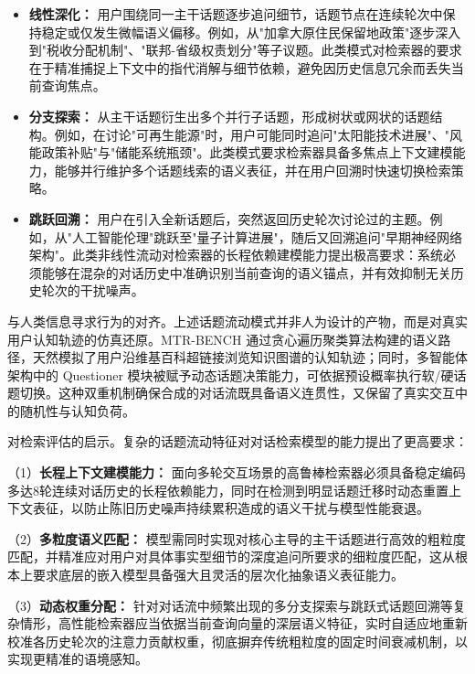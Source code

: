\begin{itemize}
    \item \textbf{线性深化：} 用户围绕同一主干话题逐步追问细节，话题节点在连续轮次中保持稳定或仅发生微幅语义偏移。例如，从"加拿大原住民保留地政策"逐步深入到"税收分配机制"、"联邦-省级权责划分"等子议题。此类模式对检索器的要求在于精准捕捉上下文中的指代消解与细节依赖，避免因历史信息冗余而丢失当前查询焦点。
    
    \item \textbf{分支探索：} 从主干话题衍生出多个并行子话题，形成树状或网状的话题结构。例如，在讨论"可再生能源"时，用户可能同时追问"太阳能技术进展"、"风能政策补贴"与"储能系统瓶颈"。此类模式要求检索器具备多焦点上下文建模能力，能够并行维护多个话题线索的语义表征，并在用户回溯时快速切换检索策略。
    
    \item \textbf{跳跃回溯：} 用户在引入全新话题后，突然返回历史轮次讨论过的主题。例如，从"人工智能伦理"跳跃至"量子计算进展"，随后又回溯追问"早期神经网络架构"。此类非线性流动对检索器的长程依赖建模能力提出极高要求：系统必须能够在混杂的对话历史中准确识别当前查询的语义锚点，并有效抑制无关历史轮次的干扰噪声。
\end{itemize}

与人类信息寻求行为的对齐。上述话题流动模式并非人为设计的产物，而是对真实用户认知轨迹的仿真还原。MTR-BENCH 通过贪心遍历聚类算法构建的语义路径，天然模拟了用户沿维基百科超链接浏览知识图谱的认知轨迹；同时，多智能体架构中的 Questioner 模块被赋予动态话题决策能力，可依据预设概率执行软/硬话题切换。这种双重机制确保合成的对话流既具备语义连贯性，又保留了真实交互中的随机性与认知负荷。

对检索评估的启示。复杂的话题流动特征对对话检索模型的能力提出了更高要求：

（1）\textbf{长程上下文建模能力：} 面向多轮交互场景的高鲁棒检索器必须具备稳定编码多达8轮连续对话历史的长程依赖能力，同时在检测到明显话题迁移时动态重置上下文表征，以防止陈旧历史噪声持续累积造成的语义干扰与模型性能衰退。

（2）\textbf{多粒度语义匹配：} 模型需同时实现对核心主导的主干话题进行高效的粗粒度匹配，并精准应对用户对具体事实型细节的深度追问所要求的细粒度匹配，这从根本上要求底层的嵌入模型具备强大且灵活的层次化抽象语义表征能力。

（3）\textbf{动态权重分配：} 针对对话流中频繁出现的多分支探索与跳跃式话题回溯等复杂情形，高性能检索器应当依据当前查询向量的深层语义特征，实时自适应地重新校准各历史轮次的注意力贡献权重，彻底摒弃传统粗粒度的固定时间衰减机制，以实现更精准的语境感知。


